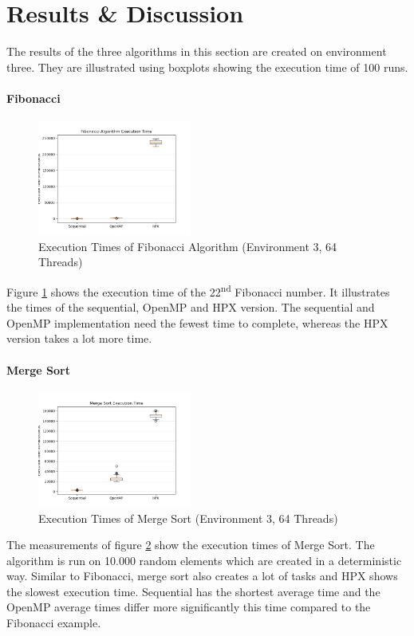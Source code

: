 \section{Results \& Discussion}

The results of the three algorithms in this section are created on environment three.
They are illustrated using boxplots showing the execution time of 100 runs.


\paragraph{Fibonacci}
\begin{figure}[htbp]
	\centering
	\includegraphics[width=0.45\textwidth]{figures/fib_NoOp.png}
	\caption{Execution Times of Fibonacci Algorithm (Environment 3, 64 Threads)}
	\label{fig:fib_NoOp}
\end{figure}

Figure \ref{fig:fib_NoOp} shows the execution time of the 22\textsuperscript{nd} Fibonacci number.
It illustrates the times of the sequential, OpenMP and HPX version.
The sequential and OpenMP implementation need the fewest time to complete, whereas the HPX version takes a lot more time.

\paragraph{Merge Sort}
  \begin{figure}[htbp]
	\centering
	\includegraphics[width=0.45\textwidth]{figures/sort_NoOp.png}
	\caption{Execution Times of Merge Sort (Environment 3, 64 Threads)}
	\label{fig:sort_NoOp}
  \end{figure}
  The measurements of figure \ref{fig:sort_NoOp} show the execution times of Merge Sort.
  The algorithm is run on 10.000 random elements which are created in a deterministic way.
  Similar to Fibonacci, merge sort also creates a lot of tasks and HPX shows the slowest execution time.
  Sequential has the shortest average time and the OpenMP average times differ more significantly this time compared to the Fibonacci example.
  
